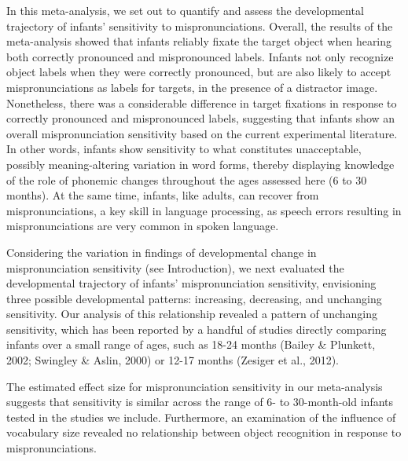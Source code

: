 \documentclass[man]{apa6}
\begin{document}
In this meta-analysis, we set out to quantify and assess the developmental trajectory of infants' sensitivity to mispronunciations. Overall, the results of the meta-analysis showed that infants reliably fixate the target object when hearing both correctly pronounced and mispronounced labels. Infants not only recognize object labels when they were correctly pronounced, but are also likely to accept mispronunciations as labels for targets, in the presence of a distractor image. Nonetheless, there was a considerable difference in target fixations in response to correctly pronounced and mispronounced labels, suggesting that infants show an overall mispronunciation sensitivity based on the current experimental literature. In other words, infants show sensitivity to what constitutes unacceptable, possibly meaning-altering variation in word forms, thereby displaying knowledge of the role of phonemic changes throughout the ages assessed here (6 to 30 months). At the same time, infants, like adults, can recover from mispronunciations, a key skill in language processing, as speech errors resulting in mispronunciations are very common in spoken language.

Considering the variation in findings of developmental change in mispronunciation sensitivity (see Introduction), we next evaluated the developmental trajectory of infants' mispronunciation sensitivity, envisioning three possible developmental patterns: increasing, decreasing, and unchanging sensitivity. Our analysis of this relationship revealed a pattern of unchanging sensitivity, which has been reported by a handful of studies directly comparing infants over a small range of ages, such as 18-24 months (Bailey \& Plunkett, 2002; Swingley \& Aslin, 2000) or 12-17 months (Zesiger et al., 2012).

The estimated effect size for mispronunciation sensitivity in our meta-analysis suggests that sensitivity is similar across the range of 6- to 30-month-old infants tested in the studies we include. Furthermore, an examination of the influence of vocabulary size revealed no relationship between object recognition in response to mispronunciations.
\end{document}
